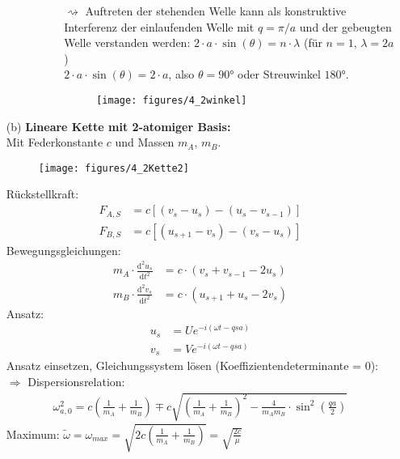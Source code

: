 \begin{itemize}
\begin{itemize}
\begin{itemize}
\begin{itemize}
					$\rightsquigarrow$ Auftreten der stehenden Welle kann als konstruktive Interferenz der einlaufenden Welle mit $ q = \pi / a $ und der gebeugten Welle verstanden werden: $ 2 \cdot a \cdot \sin(\theta) = n \cdot \lambda $ (für $n=1$, $\lambda = 2a$) \\
					$2 \cdot a \cdot \sin(\theta) = 2 \cdot a $, also $\theta = \ang{90}$ oder Streuwinkel $\ang{180}$.
					\begin{figure}[H]
						\centering
						\texttt{[image: figures/4\_2winkel]}
						\caption{}
						\label{fig:4_2winkel}
					\end{figure}
				\end{itemize} 
			\end{itemize}
	\end{itemize}
	\item[(b)] \textbf{Lineare Kette mit 2-atomiger Basis:} \\
		Mit Federkonstante $c$ und Massen $m_A$, $m_B$.
		\begin{figure}[H]
			\centering
			\texttt{[image: figures/4\_2Kette2]}
			\caption{}
			\label{fig:4_2kette2}
		\end{figure} 
		Rückstellkraft:
		\begin{align*}
			F_{A,S} &= c \left[(v_s - u_s) - (u_s - v_{s-1})\right] \\
			F_{B,S} &= c \left[(u_{s+1} - v_s) - (v_s - u_{s})\right] 
		\end{align*}
		Bewegungsgleichungen:
		\begin{align*}
			m_A \cdot \frac{\mathrm{d}^2u_s}{\mathrm{d}t^2} &= c \cdot (v_s + v_{s-1} - 2 u_s) \\
			m_B \cdot \frac{\mathrm{d}^2v_s}{\mathrm{d}t^2} &= c \cdot (u_{s+1} + u_s - 2 v_s)
		\end{align*}
		Ansatz:
		\begin{align*}
			u_s &= U e^{-i(\omega t - q s a)} \\
			v_s &= V e^{-i(\omega t - q s a)}
		\end{align*}
		Ansatz einsetzen, Gleichungssystem lösen (Koeffizientendeterminante = 0):\\
		$\Rightarrow$ Dispersionsrelation:
		\begin{align*}
			\omega_{a,0}^2 = c \left( \frac{1}{m_A} + \frac{1}{m_B} \right) \mp c \sqrt{\left( \frac{1}{m_A} + \frac{1}{m_B} \right)^2 - \frac{4}{m_A m_B} \cdot \sin^2 \left(\frac{qa}{2}\right)}
		\end{align*}
		Maximum: $\tilde{\omega} = \omega_{max} = \sqrt{2c \left( \frac{1}{m_A} + \frac{1}{m_B} \right)} = \sqrt{\frac{2c}{\mu}}$

\end{itemize}
